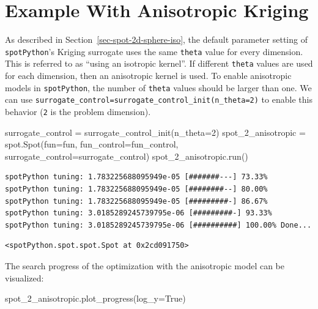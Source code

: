 \documentclass[
  letterpaper,
  DIV=11,
  numbers=noendperiod]{scrreprt}
\newenvironment{Shaded}{\begin{snugshade}}{\end{snugshade}}
\newcommand{\DecValTok}[1]{\textcolor[rgb]{0.68,0.00,0.00}{#1}}
\newcommand{\NormalTok}[1]{\textcolor[rgb]{0.00,0.23,0.31}{#1}}
\newcommand{\OperatorTok}[1]{\textcolor[rgb]{0.37,0.37,0.37}{#1}}
\newcommand{\VariableTok}[1]{\textcolor[rgb]{0.07,0.07,0.07}{#1}}
\begin{document}
\section{Example With Anisotropic
Kriging}\label{example-with-anisotropic-kriging}

As described in Section~\ref{sec-spot-2d-sphere-iso}, the default
parameter setting of \texttt{spotPython}'s Kriging surrogate uses the
same \texttt{theta} value for every dimension. This is referred to as
``using an isotropic kernel''. If different \texttt{theta} values are
used for each dimension, then an anisotropic kernel is used. To enable
anisotropic models in \texttt{spotPython}, the number of \texttt{theta}
values should be larger than one. We can use
\texttt{surrogate\_control=surrogate\_control\_init(n\_theta=2)} to
enable this behavior (\texttt{2} is the problem dimension).

\begin{Shaded}
\begin{Highlighting}[]
\NormalTok{surrogate\_control }\OperatorTok{=}\NormalTok{ surrogate\_control\_init(n\_theta}\OperatorTok{=}\DecValTok{2}\NormalTok{)}
\NormalTok{spot\_2\_anisotropic }\OperatorTok{=}\NormalTok{ spot.Spot(fun}\OperatorTok{=}\NormalTok{fun,}
\NormalTok{                    fun\_control}\OperatorTok{=}\NormalTok{fun\_control,}
\NormalTok{                    surrogate\_control}\OperatorTok{=}\NormalTok{surrogate\_control)}
\NormalTok{spot\_2\_anisotropic.run()}
\end{Highlighting}
\end{Shaded}

\begin{verbatim}
spotPython tuning: 1.783225688095949e-05 [#######---] 73.33% 
spotPython tuning: 1.783225688095949e-05 [########--] 80.00% 
spotPython tuning: 1.783225688095949e-05 [#########-] 86.67% 
spotPython tuning: 3.0185289245739795e-06 [#########-] 93.33% 
spotPython tuning: 3.0185289245739795e-06 [##########] 100.00% Done...
\end{verbatim}

\begin{verbatim}
<spotPython.spot.spot.Spot at 0x2cd091750>
\end{verbatim}

The search progress of the optimization with the anisotropic model can
be visualized:

\begin{Shaded}
\begin{Highlighting}[]
\NormalTok{spot\_2\_anisotropic.plot\_progress(log\_y}\OperatorTok{=}\VariableTok{True}\NormalTok{)}
\end{Highlighting}
\end{Shaded}
\end{document}

